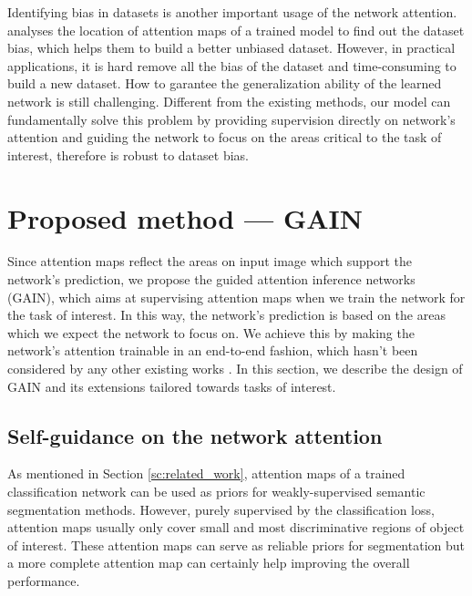 \documentclass[10pt,twocolumn,letterpaper]{article}
\begin{document}
Identifying bias in datasets \cite{torralba2011unbiased} is another important usage of the network attention. \cite{grad-cam} analyses the location of attention maps of a trained model to find out the dataset bias, which helps them to build a better unbiased dataset. However, in practical applications, it is hard remove all the bias of the dataset and time-consuming to build a new dataset. How to garantee the generalization ability of the learned network is still challenging. Different from the existing methods, our model can fundamentally solve this problem by providing supervision directly on network's attention and guiding the network to focus on the areas critical to the task of interest, therefore is robust to dataset bias.


\section{Proposed method --- GAIN}

Since attention maps reflect the areas on input image which support the network's prediction, we propose the guided attention inference networks (GAIN), which aims at supervising attention maps when we train the network for the task of interest. In this way, the network's prediction is based on the areas which we expect the network to focus on. We achieve this by making the network's attention trainable in an end-to-end fashion, which hasn't been considered by any other existing works \cite{grad-cam,zhou2016learning,wei2017object,zhang2016top,singh2017hide,kim2017two}. In this section, we describe the design of GAIN and its extensions tailored towards tasks of interest.




\subsection{Self-guidance on the network attention} \label{section:method_self}

As mentioned in Section \ref{sc:related_work}, attention maps of a trained classification network can be used as priors for weakly-supervised semantic segmentation methods. However, purely supervised by the classification loss, attention maps usually only cover small and most discriminative regions of object of interest. These attention maps can serve as reliable priors for segmentation but a more complete attention map can certainly help improving the overall performance.
\end{document}
